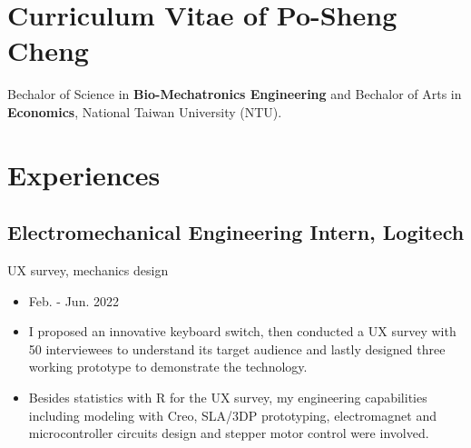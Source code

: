\documentclass[12pt]{article}
\begin{document}
    \section*{Curriculum Vitae of Po-Sheng Cheng} 
    {\sffamily
    Bechalor of Science in \textbf{Bio-Mechatronics Engineering} and Bechalor of Arts in \textbf{Economics}, National Taiwan University (NTU).
    }
    
    \section*{Experiences
    }
        \subsection*{Electromechanical Engineering Intern, Logitech}
        {\sffamily
        UX survey, mechanics design
        \begin{itemize}
            \item Feb. - Jun. 2022
            \item I proposed an innovative keyboard switch, then conducted a UX survey with 50 interviewees to understand its target audience and lastly designed three working prototype to demonstrate the technology.
            \item Besides statistics with R for the UX survey, my engineering capabilities including modeling with Creo, SLA/3DP prototyping, electromagnet and microcontroller circuits design and stepper motor control were involved.
        \end{itemize}
        }
\end{document}

